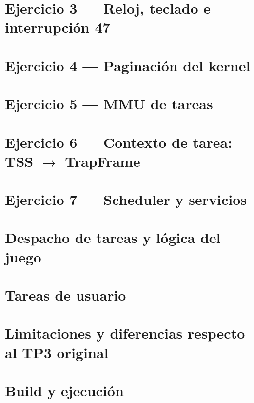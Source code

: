 \documentclass[a4paper]{article}
\begin{document}
\section{Ejercicio 3 --- Reloj, teclado e interrupción 47}

\newpage
\section{Ejercicio 4 --- Paginación del kernel}

\newpage
\section{Ejercicio 5 --- MMU de tareas}

\newpage
\section{Ejercicio 6 --- Contexto de tarea: TSS $\to$ TrapFrame}

\newpage
\section{Ejercicio 7 --- Scheduler y servicios}

\newpage
\section{Despacho de tareas y lógica del juego}

\newpage
\section{Tareas de usuario}
\label{sec:user}

\newpage
\section{Limitaciones y diferencias respecto al TP3 original}
\label{sec:limitaciones}

\newpage
\section{Build y ejecución}

\newpage
\end{document}
